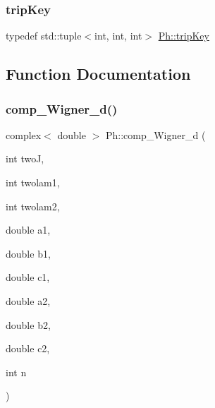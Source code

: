 \subsubsection{\texorpdfstring{tripKey}{tripKey}}
{\footnotesize\ttfamily typedef std\+::tuple$<$int, int, int$>$ \mbox{\hyperlink{namespacePh_afdd5bf3d7b37625115089ea3048e0cbb}{Ph\+::trip\+Key}}}



\subsection{Function Documentation}
\mbox{\label{namespacePh_a47fd4e2846a9ce86464940bc5f4cccf8}} 
\subsubsection{\texorpdfstring{comp\_Wigner\_d()}{comp\_Wigner\_d()}}
{\footnotesize\ttfamily complex$<$ double $>$ Ph\+::comp\+\_\+\+Wigner\+\_\+d (\begin{DoxyParamCaption}\item[{int}]{twoJ,  }\item[{int}]{twolam1,  }\item[{int}]{twolam2,  }\item[{double}]{a1,  }\item[{double}]{b1,  }\item[{double}]{c1,  }\item[{double}]{a2,  }\item[{double}]{b2,  }\item[{double}]{c2,  }\item[{int}]{n }\end{DoxyParamCaption})}

